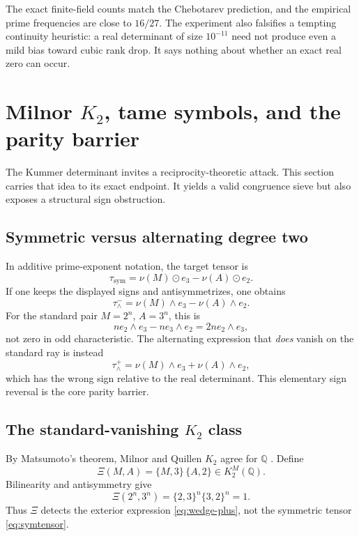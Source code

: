 \documentclass[11pt]{article}
\numberwithin{equation}{section}
\theoremstyle{definition}
\theoremstyle{remark}
\newcommand{\Q}{\mathbb Q}
\begin{document}
\begin{statusbox}
The exact finite-field counts match the Chebotarev prediction, and the empirical prime
frequencies are close to \(16/27\).  The experiment also falsifies a tempting continuity
heuristic: a real determinant of size \(10^{-11}\) need not produce even a mild bias toward
cubic rank drop.  It says nothing about whether an exact real zero can occur.
\end{statusbox}

\section{Milnor \texorpdfstring{\(K_2\)}{K2}, tame symbols, and the parity barrier}
\label{sec:K2}

The Kummer determinant invites a reciprocity-theoretic attack.  This section carries that
idea to its exact endpoint.  It yields a valid congruence sieve but also exposes a structural
sign obstruction.

\subsection{Symmetric versus alternating degree two}

In additive prime-exponent notation, the target tensor is
\[
 \tau_{\mathrm{sym}}=\nu(M)\odot e_3-\nu(A)\odot e_2.
\]
If one keeps the displayed signs and antisymmetrizes, one obtains
\begin{equation}
 \tau^-_{\wedge}=\nu(M)\wedge e_3-\nu(A)\wedge e_2.\label{eq:wedge-minus}
\end{equation}
For the standard pair \(M=2^n\), \(A=3^n\), this is
\[
 ne_2\wedge e_3-ne_3\wedge e_2=2n e_2\wedge e_3,
\]
not zero in odd characteristic.  The alternating expression that \emph{does} vanish on the
standard ray is instead
\begin{equation}
 \tau^+_{\wedge}=\nu(M)\wedge e_3+\nu(A)\wedge e_2,\label{eq:wedge-plus}
\end{equation}
which has the wrong sign relative to the real determinant.  This elementary sign reversal is
the core parity barrier.

\subsection{The standard-vanishing \texorpdfstring{\(K_2\)}{K2} class}

By Matsumoto's theorem, Milnor and Quillen \(K_2\) agree for \(\Q\)
\cite{MilnorK,WeibelK}.  Define
\begin{equation}
 \Xi(M,A)=\{M,3\}\,\{A,2\}\in K_2^M(\Q).\label{eq:Xi}
\end{equation}
Bilinearity and antisymmetry give
\[
 \Xi(2^n,3^n)=\{2,3\}^n\{3,2\}^n=1.
\]
Thus \(\Xi\) detects the exterior expression \eqref{eq:wedge-plus}, not the symmetric tensor
\eqref{eq:symtensor}.
\end{document}
